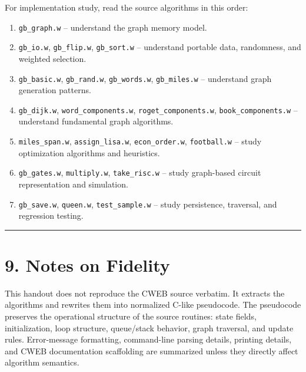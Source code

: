 \documentclass[11pt]{article}
\providecommand{\tightlist}{\setlength{\itemsep}{0pt}\setlength{\parskip}{0pt}}
\begin{document}
For implementation study, read the source algorithms in this order:

\begin{enumerate}
\def\labelenumi{\arabic{enumi}.}
\tightlist
\item
  \texttt{gb\_graph.w} -- understand the graph memory model.
\item
  \texttt{gb\_io.w}, \texttt{gb\_flip.w}, \texttt{gb\_sort.w} -- understand portable data, randomness, and weighted selection.
\item
  \texttt{gb\_basic.w}, \texttt{gb\_rand.w}, \texttt{gb\_words.w}, \texttt{gb\_miles.w} -- understand graph generation patterns.
\item
  \texttt{gb\_dijk.w}, \texttt{word\_components.w}, \texttt{roget\_components.w}, \texttt{book\_components.w} -- understand fundamental graph algorithms.
\item
  \texttt{miles\_span.w}, \texttt{assign\_lisa.w}, \texttt{econ\_order.w}, \texttt{football.w} -- study optimization algorithms and heuristics.
\item
  \texttt{gb\_gates.w}, \texttt{multiply.w}, \texttt{take\_risc.w} -- study graph-based circuit representation and simulation.
\item
  \texttt{gb\_save.w}, \texttt{queen.w}, \texttt{test\_sample.w} -- study persistence, traversal, and regression testing.
\end{enumerate}

\begin{center}\rule{0.5\linewidth}{0.5pt}\end{center}

\section{9. Notes on Fidelity}\label{notes-on-fidelity}

This handout does not reproduce the CWEB source verbatim. It extracts the algorithms and rewrites them into normalized C-like pseudocode. The pseudocode preserves the operational structure of the source routines: state fields, initialization, loop structure, queue/stack behavior, graph traversal, and update rules. Error-message formatting, command-line parsing details, printing details, and CWEB documentation scaffolding are summarized unless they directly affect algorithm semantics.
\end{document}
